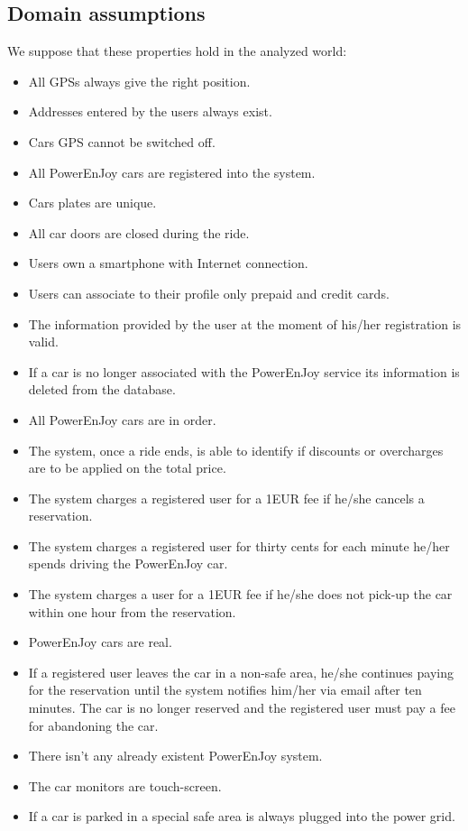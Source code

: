 \subsection{Domain assumptions}
\label{Domain_properties}
We suppose that these properties hold in the analyzed world:
\begin{itemize}
	\item All GPSs always give the right position.
	\item Addresses entered by the users always exist.
	\item Cars GPS cannot be switched off.
	\item All PowerEnJoy cars are registered into the system.
	\item Cars plates are unique.
	\item All car doors are closed during the ride.
	\item Users own a smartphone with Internet connection.
	\item Users can associate to their profile only prepaid and credit cards.
	\item The information provided by the user at the moment of his/her registration is valid.
	\item If a car is no longer associated with the PowerEnJoy service its information is deleted from the database.
	\item All PowerEnJoy cars are in order.
	\item The system, once a ride ends, is able to identify if discounts or overcharges are to be applied on the total price.
	\item The system charges a registered user for a 1EUR fee if he/she cancels a reservation.
	\item The system charges a registered user for thirty cents for each minute he/her spends driving the PowerEnJoy car. 
	\item The system charges a user for a 1EUR fee if he/she does not pick-up the car within one hour from the reservation. 
	\item PowerEnJoy cars are real.
	\item If a registered user leaves the car in a non-safe area, he/she continues paying for the reservation until the system notifies him/her via email after ten minutes. The car is no longer reserved and the registered user must pay a fee for abandoning the car.
	\item There isn't any already existent PowerEnJoy system.
	\item The car monitors are touch-screen.
	\item If a car is parked in a special safe area is always plugged into the power grid.
\end{itemize}
\newpage

